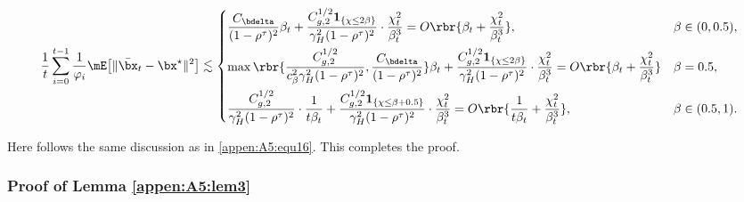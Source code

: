 \begin{footnotesize}
\begin{equation}\label{appen:A5:equ22}
\frac{1}{t}\sum_{i=0}^{t-1}\frac{1}{\varphi_i}\mE\big[\|\bar{\bx}_t-\bx^\star\|^2\big]
\lesssim \begin{dcases}
\frac{C_{\bdelta}}{(1-\rho^\tau)^2}\beta_t + \frac{C_{g,2}^{1/2}\mathbf{1}_{\{\chi\leq 2\beta\}}}{\gamma_H^2(1-\rho^\tau)^2 }\cdot \frac{\chi_t^2}{\beta_t^3} = O\rbr{\beta_t + \frac{\chi_t^2}{\beta_t^3}}, &\beta\in(0,0.5),\\
\max\rbr{\frac{C_{g,2}^{1/2}}{c_{\beta}^2 \gamma_H^2(1-\rho^\tau)^2}, \frac{ C_{\bdelta}}{(1-\rho^\tau)^2}}\beta_t + \frac{C_{g,2}^{1/2}\mathbf{1}_{\{\chi\leq 2\beta\}}}{\gamma_H^2(1-\rho^\tau)^2 }\cdot \frac{\chi_t^2}{\beta_t^3} = O\rbr{\beta_t + \frac{\chi_t^2}{\beta_t^3}} &\beta=0.5,\\
\frac{C_{g,2}^{1/2}}{\gamma_H^2(1-\rho^\tau)^2}\cdot\frac{1}{t\beta_t} + \frac{C_{g,2}^{1/2}\mathbf{1}_{\{\chi\leq \beta+0.5\}}}{\gamma_H^2(1-\rho^\tau)^2}\cdot \frac{\chi_t^2}{\beta_t^3} = O\rbr{\frac{1}{t\beta_t} + \frac{\chi_t^2}{\beta_t^3}}, &\beta\in(0.5,1).
\end{dcases}
\end{equation}
\end{footnotesize}
\hskip-3.5pt Here follows the same discussion as in \eqref{appen:A5:equ16}. This completes the proof.


\subsubsection{Proof of Lemma \ref{appen:A5:lem3}}\label{pf:I2}

